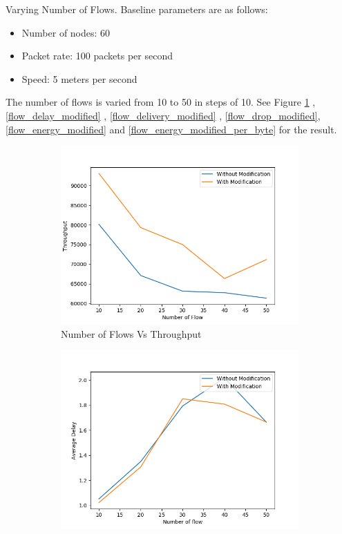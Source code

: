 Varying Number of Flows.
Baseline parameters are as follows:
\begin{itemize}
    \item Number of nodes: 60
    \item Packet rate: 100 packets per second
    \item Speed: 5 meters per second
\end{itemize}
The number of flows is varied from 10 to 50 in steps of 10.
See Figure \ref{flow_throughput_modified} ,\ref{flow_delay_modified} , \ref{flow_delivery_modified} , \ref{flow_drop_modified}, \ref{flow_energy_modified} and \ref{flow_energy_modified_per_byte} for the result.
\begin{figure}[h]
\begin{subfigure}{.5\textwidth}
  \centering
  \includegraphics[width=.8\linewidth]{modified_fig/NumberofFlowvsThroughput.png}
     \caption{Number of Flows Vs Throughput}
    \label{flow_throughput_modified}
\end{subfigure}
\begin{subfigure}{.5\textwidth}
  \centering
  \includegraphics[width=.8\linewidth]{modified_fig/NumberofFlowvsAverageDelay.png}

\end{subfigure}
\end{figure}
